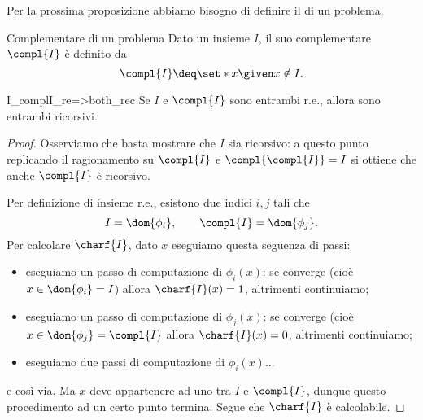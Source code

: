 Per la prossima proposizione abbiamo bisogno di definire il  di un problema.

\begin{definition}
    {Complementare di un problema}{}
    Dato un insieme $I$, il suo complementare $\compl{I}$ è definito da \[
        \compl{I} \deq \set*{x \given x \notin I}.
    \] 
\end{definition}

\begin{proposition}{}{I_complI_re=>both_rec}
    Se $I$ e $\compl{I}$ sono entrambi r.e., allora sono entrambi ricorsivi.
\end{proposition}
\begin{proof}
    Osserviamo che basta mostrare che $I$ sia ricorsivo: a questo punto replicando il ragionamento su $\compl{I}$ e $\compl{\compl{I}} = I$ si ottiene che anche $\compl{I}$ è ricorsivo.
    
    Per definizione di insieme r.e., esistono due indici $i, j$ tali che \[
        I = \dom{\phi_i}, \qquad \compl{I} = \dom{\phi_j}. 
    \] Per calcolare $\charf{I}$, dato $x$ eseguiamo questa seguenza di passi:
    \begin{itemize}
        \item eseguiamo un passo di computazione di $\phi_i(x)$: se converge (cioè $x \in \dom{\phi_i} = I$) allora $\charf{I}(x) = 1$, altrimenti continuiamo;
        \item eseguiamo un passo di computazione di $\phi_j(x)$: se converge (cioè $x \in \dom{\phi_j} = \compl{I}$ allora $\charf{I}(x) = 0$, altrimenti continuiamo;    
        \item eseguiamo due passi di computazione di $\phi_i(x)$... 
    \end{itemize}
    e così via. Ma $x$ deve appartenere ad uno tra $I$ e $\compl{I}$, dunque questo procedimento ad un certo punto termina. Segue che $\charf{I}$ è calcolabile.  
\end{proof}
